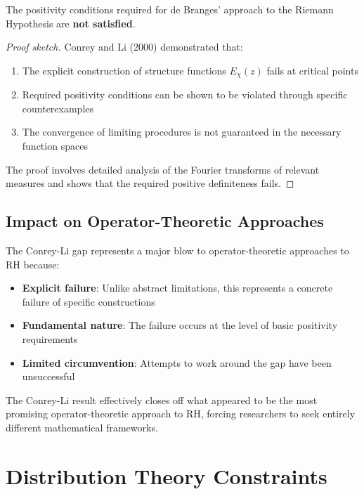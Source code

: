 \begin{theorem}
\label{thm:conrey_li_gap}
The positivity conditions required for de Branges' approach to the Riemann Hypothesis are \textbf{not satisfied}.
\end{theorem}

\begin{proof}[Proof sketch]
Conrey and Li (2000) \cite{conreyli2000} demonstrated that:
\begin{enumerate}
\item The explicit construction of structure functions $E_\chi(z)$ fails at critical points
\item Required positivity conditions can be shown to be violated through specific counterexamples
\item The convergence of limiting procedures is not guaranteed in the necessary function spaces
\end{enumerate}

The proof involves detailed analysis of the Fourier transforms of relevant measures and shows that the required positive definiteness fails.
\end{proof}

\subsection{Impact on Operator-Theoretic Approaches}

The Conrey-Li gap represents a major blow to operator-theoretic approaches to RH because:

\begin{itemize}
\item \textbf{Explicit failure}: Unlike abstract limitations, this represents a concrete failure of specific constructions
\item \textbf{Fundamental nature}: The failure occurs at the level of basic positivity requirements
\item \textbf{Limited circumvention}: Attempts to work around the gap have been unsuccessful
\end{itemize}

\begin{remark}
The Conrey-Li result \cite{conreyli2000} effectively closes off what appeared to be the most promising operator-theoretic approach to RH, forcing researchers to seek entirely different mathematical frameworks.
\end{remark}

\section{Distribution Theory Constraints}
\label{sec:distribution_constraints}

